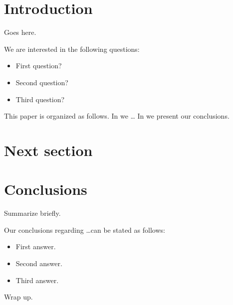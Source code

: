 \documentclass[useAMS,usenatbib]{mn2e}
\begin{document}

\section{Introduction}

Goes here.

We are interested in the following questions:

\begin{itemize}

\item First question?

\item Second question? 

\item Third question? 

\end{itemize}

This paper is organized as follows. In  we \ldots
In  we present our conclusions.



\section{Next section}
\label{sec:next}



\section{Conclusions}
\label{sec:conclude}

Summarize briefly.

Our conclusions regarding \ldots can be stated as follows:

\begin{itemize}

\item First answer.

\item Second answer. 

\item Third answer. 

\end{itemize}

Wrap up.


\end{document}
